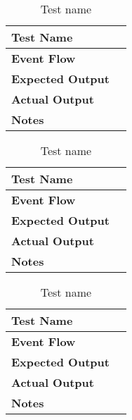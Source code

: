 \begin{table}[h]	
\centering
\def\arraystretch{1.5}
\begin{tabular}{|m{7cm}|m{7cm}|}
	\hline
	\textbf{Test Name}            &    \\ \hline
	\textbf{Event Flow}             &   \\ \hline
	\textbf{Expected Output}  &     \\ \hline
	\textbf{Actual Output}       &     \\ \hline
	\textbf{Notes} & \\ \hline
\end{tabular}
\caption{Test name}
\end{table}


\begin{table}[h]	
\centering
\def\arraystretch{1.5}
\begin{tabular}{|m{7cm}|m{7cm}|}
	\hline
	\textbf{Test Name}            &    \\ \hline
	\textbf{Event Flow}             &   \\ \hline
	\textbf{Expected Output}  &     \\ \hline
	\textbf{Actual Output}       &     \\ \hline
	\textbf{Notes} & \\ \hline
\end{tabular}
\caption{Test name}
\end{table}


\begin{table}[h]	
\centering
\def\arraystretch{1.5}
\begin{tabular}{|m{7cm}|m{7cm}|}
	\hline
	\textbf{Test Name}            &    \\ \hline
	\textbf{Event Flow}             &   \\ \hline
	\textbf{Expected Output}  &     \\ \hline
	\textbf{Actual Output}       &     \\ \hline
	\textbf{Notes} & \\ \hline
\end{tabular}
\caption{Test name}
\end{table}